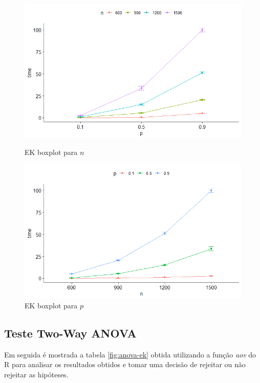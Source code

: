 \documentclass{uofa-eng-assignment}
\begin{document}
\begin{figure}[h]
    \begin{minipage}{0.45\textwidth}
        \centering
        \includegraphics[width=1\textwidth]{ek_intplot1.png}
        \caption{EK boxplot para $n$}
        \label{fig:intplot-ek-n}
    \end{minipage}\hfill
    \begin{minipage}{0.45\textwidth}
        \centering
        \includegraphics[width=1\textwidth]{ek_intplot2.png}
        \caption{EK boxplot para $p$}
        \label{fig:intplot-ek-p}
    \end{minipage}
\end{figure}

\subsection{Teste Two-Way ANOVA}

Em seguida é mostrada a tabela \ref{fig:anova-ek} obtida utilizando a função \emph{aov} do R para analisar os resultados obtidos e tomar uma decisão de rejeitar ou não rejeitar as hipóteses.
\end{document}
